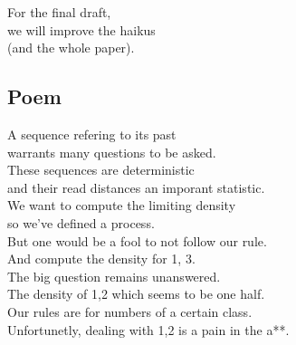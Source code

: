\documentclass[runningheads,a4paper]{llncs}
\begin{document}
\noindent For the final draft,\\
we will improve the haikus\\
(and the whole paper).

\subsection{Poem}

\noindent A sequence refering to its past\\
warrants many questions to be asked.\\
These sequences are deterministic \\
and their read distances an imporant statistic.
\\

\noindent We want to compute the limiting density\\
so we've defined a process.\\
But one would be a fool to not follow our rule.\\
And compute the density for 1, 3.\\


\noindent The big question remains unanswered.\\
The density of 1,2 which seems to be one half.\\
Our rules are for numbers of a certain class.\\
Unfortunetly, dealing with 1,2 is a pain in the a**.\\
\end{document}
